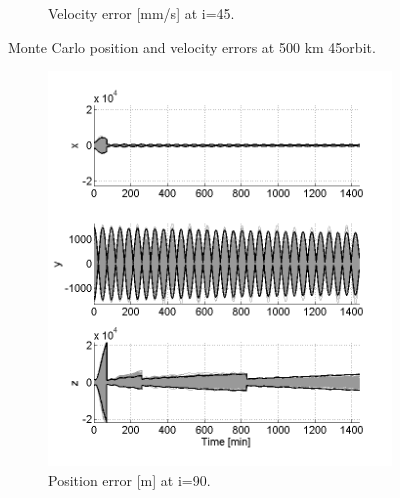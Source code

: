 \documentclass[]{aiaa-tc}%
\begin{document}
\begin{figure}[h!]
\begin{subfigure}{.49\textwidth}
		\caption{Velocity error [mm/s] at i=45\degree.}
		\label{fig:mcvel45_500}
	\end{subfigure}
	\caption{Monte Carlo position and velocity errors at 500 km 45\degree orbit.}
	\label{fig:mc45_500}
\end{figure}
%
%
\begin{figure}[h!]
	\centering
	\begin{subfigure}{.49\textwidth}
		\centering
		\includegraphics{MC_pos90_500}
		\caption{Position error [m] at i=90\degree.}
		\label{fig:mcposl90_500}
	\end{subfigure}%
	\begin{subfigure}{.49\textwidth} 
		\centering

\end{subfigure}
\end{figure}
\end{document}

